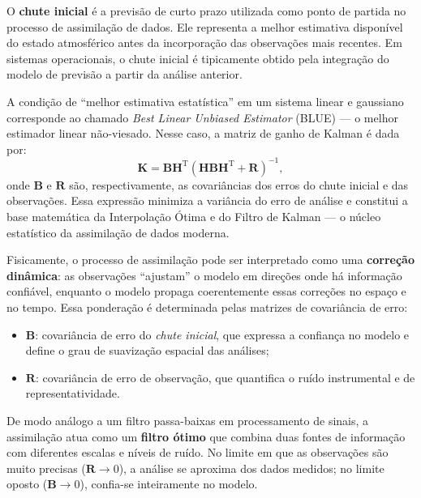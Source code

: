 \begin{definicao}
O \textbf{chute inicial} é a previsão de curto prazo utilizada como ponto de partida no processo de assimilação de dados.  
Ele representa a melhor estimativa disponível do estado atmosférico antes da incorporação das observações mais recentes.  
Em sistemas operacionais, o chute inicial é tipicamente obtido pela integração do modelo de previsão a partir da análise anterior.
\end{definicao}


\begin{nota}
A condição de ``melhor estimativa estatística'' em um sistema linear e gaussiano corresponde ao chamado \textit{Best Linear Unbiased Estimator} (BLUE) --- o melhor estimador linear não-viesado.  
Nesse caso, a matriz de ganho de Kalman é dada por:
\[
\mathbf{K} = \mathbf{B}\mathbf{H}^\mathrm{T}(\mathbf{H}\mathbf{B}\mathbf{H}^\mathrm{T} + \mathbf{R})^{-1},
\]
onde \( \mathbf{B} \) e \( \mathbf{R} \) são, respectivamente, as covariâncias dos erros do chute inicial e das observações.  
Essa expressão minimiza a variância do erro de análise e constitui a base matemática da Interpolação Ótima e do Filtro de Kalman --- o núcleo estatístico da assimilação de dados moderna.
\end{nota}

Fisicamente, o processo de assimilação pode ser interpretado como uma \textbf{correção dinâmica}: as observações “ajustam” o modelo em direções onde há informação confiável, enquanto o modelo propaga coerentemente essas correções no espaço e no tempo.  
Essa ponderação é determinada pelas matrizes de covariância de erro:
\begin{itemize}
  \item \( \mathbf{B} \): covariância de erro do \textit{chute inicial}, que expressa a confiança no modelo e define o grau de suavização espacial das análises;
  \item \( \mathbf{R} \): covariância de erro de observação, que quantifica o ruído instrumental e de representatividade.
\end{itemize}

De modo análogo a um filtro passa-baixas em processamento de sinais, a assimilação atua como um \textbf{filtro ótimo} que combina duas fontes de informação com diferentes escalas e níveis de ruído.  
No limite em que as observações são muito precisas (\( \mathbf{R} \to 0 \)), a análise se aproxima dos dados medidos; no limite oposto (\( \mathbf{B} \to 0 \)), confia-se inteiramente no modelo.

